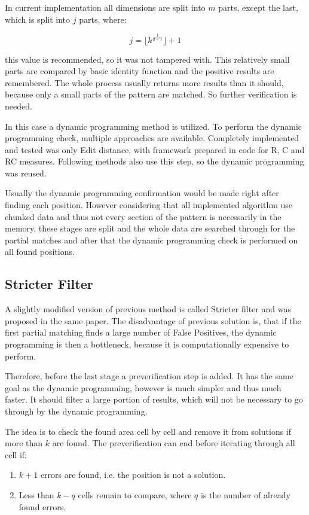 In current implementation all dimensions are split into $m$ parts, except the last, which is split into $j$ parts, where:

$$j = \lfloor k^{\frac{1}{d-1}} \rfloor + 1$$

this value is recommended, so it was not tampered with. This relatively small parts are compared by basic identity function and the positive results are remembered. The whole process usually returns more results than it should, because only a small parts of the pattern are matched. So further verification is needed.

In this case a dynamic programming method is utilized. To perform the dynamic programming check, multiple approaches are available. Completely implemented and tested was only Edit distance, with framework prepared in code for R, C and RC measures. Following methods also use this step, so the dynamic programming was reused.

Usually the dynamic programming confirmation would be made right after finding each position. However considering that all implemented algorithm use chunked data and thus not every section of the pattern is necessarily in the memory, these stages are split and the whole data are searched through for the partial matches and after that the dynamic programming check is performed on all found positions.

\subsection{Stricter Filter}
A slightly modified version of previous method is called Stricter filter and was proposed in the same paper. The disadvantage of previous solution is, that if the first partial matching finds a large number of False Positives, the dynamic programming is then a bottleneck, because it is computationally expensive to perform.

Therefore, before the last stage a preverification step is added. It has the same goal as the dynamic programming, however is much simpler and thus much faster. It should filter a large portion of results, which will not be necessary to go through by the dynamic programming.

The idea is to check the found area cell by cell and remove it from solutions if more than $k$ are found. The preverification can end before iterating through all cell if:

\begin{enumerate}
\item $k+1$ errors are found, i.e. the position is not a solution.
\item Less than $k - q$ cells remain to compare, where $q$ is the number of already found errors.
\end{enumerate}


